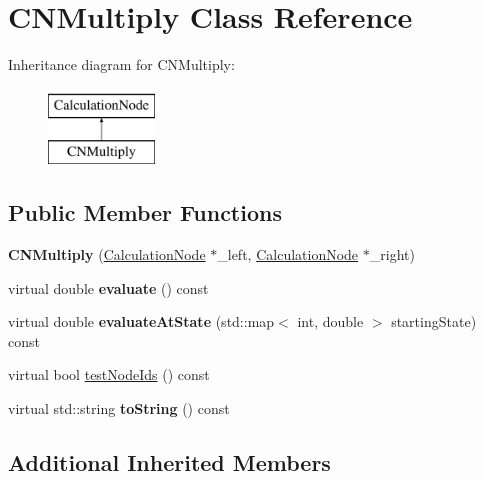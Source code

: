 \hypertarget{classCNMultiply}{}\section{C\+N\+Multiply Class Reference}
\label{classCNMultiply}
Inheritance diagram for C\+N\+Multiply\+:\begin{figure}[H]
\begin{center}
\leavevmode
\includegraphics[height=2.000000cm]{classCNMultiply}
\end{center}
\end{figure}
\subsection*{Public Member Functions}
\begin{DoxyCompactItemize}
\item 
{\bfseries C\+N\+Multiply} (\hyperlink{classCalculationNode}{Calculation\+Node} $\ast$\+\_\+left, \hyperlink{classCalculationNode}{Calculation\+Node} $\ast$\+\_\+right)\hypertarget{classCNMultiply_a440c0e25b1fb642c95757a9118634874}{}\label{classCNMultiply_a440c0e25b1fb642c95757a9118634874}

\item 
virtual double {\bfseries evaluate} () const \hypertarget{classCNMultiply_a51ce205165bfa5842002721332c14f5c}{}\label{classCNMultiply_a51ce205165bfa5842002721332c14f5c}

\item 
virtual double {\bfseries evaluate\+At\+State} (std\+::map$<$ int, double $>$ starting\+State) const \hypertarget{classCNMultiply_a8daa0d3ea8f08db43b6e168f6ca9527b}{}\label{classCNMultiply_a8daa0d3ea8f08db43b6e168f6ca9527b}

\item 
virtual bool \hyperlink{classCNMultiply_a9ffc252a3cc6ccdb3ef9ee4700f0ac18}{test\+Node\+Ids} () const 
\item 
virtual std\+::string {\bfseries to\+String} () const \hypertarget{classCNMultiply_a55edebadef3ea3df839dd8779f1e2e13}{}\label{classCNMultiply_a55edebadef3ea3df839dd8779f1e2e13}

\end{DoxyCompactItemize}
\subsection*{Additional Inherited Members}


